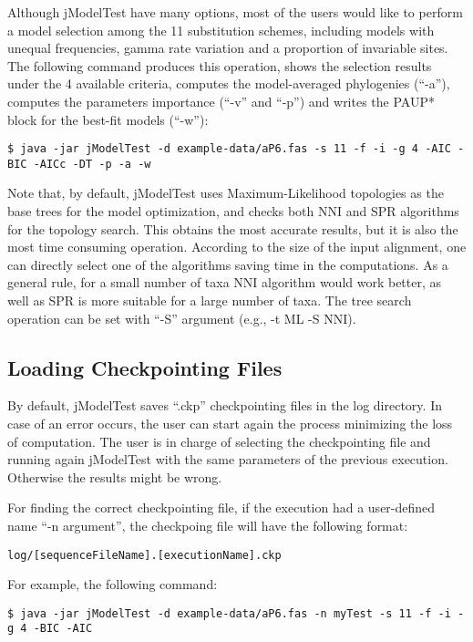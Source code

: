 \documentclass[11pt,twoside,a4paper]{article}
\begin{document}
Although jModelTest have many options, most of the users would like to perform a model selection among the 11 substitution schemes, including models with unequal frequencies, gamma rate variation and a proportion of invariable sites. The following command produces this operation, shows the selection results under the 4 available criteria, computes the model-averaged phylogenies (``-a''), computes the parameters importance (``-v'' and ``-p'') and writes the PAUP* block for the best-fit models (``-w''):

\begin{lstlisting}
$ java -jar jModelTest -d example-data/aP6.fas -s 11 -f -i -g 4 -AIC -BIC -AICc -DT -p -a -w
\end{lstlisting}

Note that, by default, jModelTest uses Maximum-Likelihood topologies as the base trees for the model optimization, and checks both NNI and SPR algorithms for the topology search. This obtains the most accurate results, but it is also the most time consuming operation. According to the size of the input alignment, one can directly select one of the algorithms saving time in the computations. As a general rule, for a small number of taxa NNI algorithm would work better, as well as SPR is more suitable for a large number of taxa. The tree search operation can be set with ``-S'' argument (e.g., -t ML -S NNI).

\subsection{Loading Checkpointing Files}

By default, jModelTest saves ``.ckp'' checkpointing files in the log directory. In case of an error occurs, the user can start again the process minimizing the loss of computation. The user is in charge of selecting the checkpointing file and running again jModelTest with the same parameters of the previous execution. Otherwise the results might be wrong.

For finding the correct checkpointing file, if the execution had a user-defined name ``-n argument'', the checkpoing file will have the following format: 

\begin{lstlisting}
log/[sequenceFileName].[executionName].ckp
\end{lstlisting}

For example, the following command:

\begin{lstlisting}
$ java -jar jModelTest -d example-data/aP6.fas -n myTest -s 11 -f -i -g 4 -BIC -AIC
\end{lstlisting}
\end{document}

